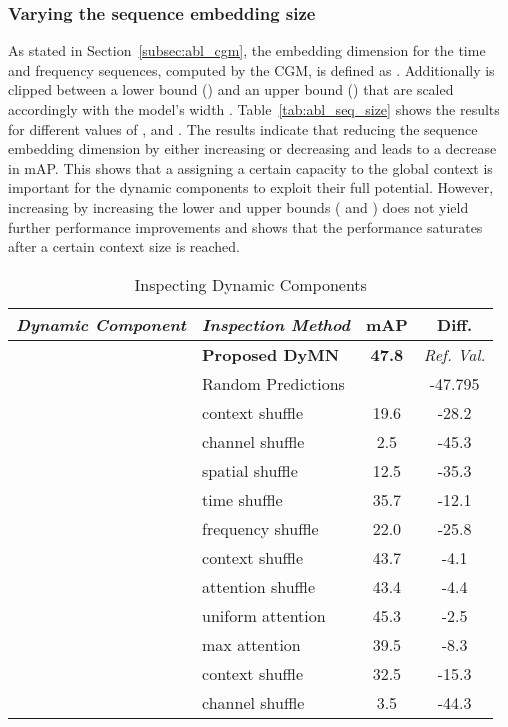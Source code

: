 \documentclass[lettersize,journal]{IEEEtran}
\begin{document}
\subsubsection{Varying the sequence embedding size }
\label{subsubsec:cgm_H}

As stated in Section~\ref{subsec:abl_cgm}, the embedding dimension for the time and frequency sequences, computed by the CGM, is defined as . Additionally  is clipped between a lower bound ()  and an upper bound () that are scaled accordingly with the model's width . Table~\ref{tab:abl_seq_size} shows the results for different values of ,  and . The results indicate that reducing the sequence embedding dimension  by either increasing  or decreasing  and  leads to a decrease in mAP. This shows that a assigning a certain capacity to the global context is important for the dynamic components to exploit their full potential. However, increasing  by increasing the lower and upper bounds ( and ) does not yield further performance improvements and shows that the performance saturates after a certain context size is reached. 









\begin{table}[t!]
\centering
\caption{Inspecting Dynamic Components}
\label{tab:inspecting}
\begin{tabular}{@{}llcc@{}}
\toprule
\textit{Dynamic Component}&\textit{Inspection Method} & \textbf{mAP} & \textbf{Diff.}  \\ \midrule
&\textbf{Proposed DyMN} &
\textbf{47.8} & \textit{Ref. Val.} \\
&Random Predictions &
 & -47.795 \\
\midrule
\parbox[t]{10mm}{}
& context shuffle & 19.6 &  -28.2  \\
& channel shuffle & 2.5 &   -45.3 \\ 
& spatial shuffle & 12.5  &  -35.3  \\
& time shuffle & 35.7 &  -12.1  \\ 
& frequency shuffle & 22.0 &  -25.8  \\ 
\midrule
\parbox[t]{10mm}{} 
& context shuffle & 43.7 &  -4.1  \\
& attention shuffle & 43.4 &  -4.4 \\ 
& uniform attention & 45.3 &  -2.5 \\ 
& max attention & 39.5  &  -8.3 \\ 
\midrule
\parbox[t]{10mm}{}
& context shuffle & 32.5 &  -15.3 \\ 
& channel shuffle & 3.5 &   -44.3 \\ 
 \bottomrule
\end{tabular}
\end{table}
\end{document}
